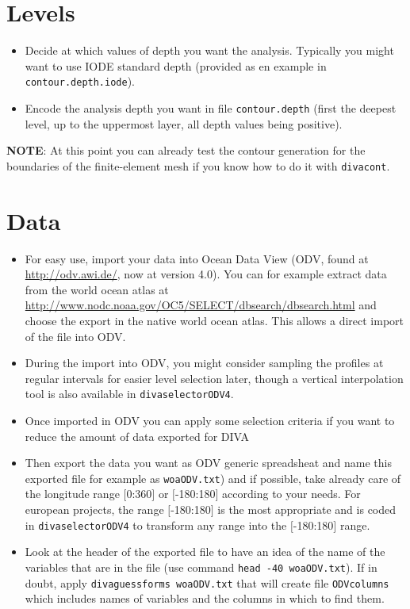 \documentclass[8pt,a4paper,notitlepage]{book}
\newcommand{\diva}{DIVA}
\begin{document}
\section{Levels}

\begin{itemize}
\item Decide at which values of depth you want the analysis. Typically you might want to use IODE standard depth (provided as en example in {\tt contour.depth.iode}).
\item Encode the analysis depth you want in file {\tt contour.depth} (first the deepest level, up to the uppermost layer, all depth values being positive).
\end{itemize}

{\bf NOTE}: At this point you can already test the contour generation for the boundaries of the finite-element mesh if you know how to do it with {\tt divacont}.

\section{Data}


\begin{itemize}
\item
For easy use, import your data into Ocean Data View (ODV, found at \url{http://odv.awi.de/}, now at version 4.0). You can for example extract data from the world ocean atlas at \url{http://www.nodc.noaa.gov/OC5/SELECT/dbsearch/dbsearch.html} and choose the export in the native world ocean atlas. This allows a direct import of the file into ODV.
\item During the import into ODV, you might consider sampling the profiles at regular intervals for easier level selection later, though a vertical interpolation tool is also available in {\tt divaselectorODV4}.
\item Once imported in ODV you can apply some selection criteria if you want to reduce the amount of data exported for \diva 
\item Then export the data you want as ODV generic spreadsheat and name this exported file for example as {\tt woaODV.txt}) and if possible, take already care of the longitude range  $[$0:360$]$ or $[$-180:180$]$ according to your needs. For european projects, the range $[$-180:180$]$  is the most appropriate and is coded in {\tt divaselectorODV4} to transform any range into the $[$-180:180$]$ range.
\item Look at the header of the exported file to have an idea of the name of the variables that are in the file (use command {\tt head -40 woaODV.txt}). If in doubt, apply {\tt divaguessforms woaODV.txt} that will create file {\tt ODVcolumns} which includes names of variables and the columns in which to find them.
\end{itemize}
\end{document}
